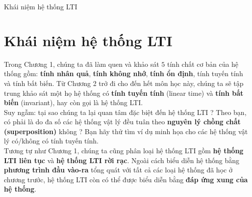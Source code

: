 \documentclass[8pt]{beamer}
\begin{document}
\begin{frame}{Khái niệm hệ thống LTI}
\section{Khái niệm hệ thống LTI}
Trong \alert{Chương 1}, chúng ta đã làm quen và khảo sát $5$ tính chất cơ bản của hệ thống gồm: \textbf{tính nhân quả}, \textbf{tính không nhớ}, \textbf{tính ổn định}, \alert{tính tuyến tính} và \alert{tính bất biến}. Từ \alert{Chương 2} trở đi cho đến hết môn học này, chúng ta sẽ tập trung khảo sát một họ hệ thống có \textbf{tính tuyến tính} (linear time) và \textbf{tính bất biến} (invariant), hay còn gọi là \alert{hệ thống LTI}.
\\ Suy ngẫm: tại sao chúng ta lại quan tâm đặc biệt đến hệ thống LTI ? Theo bạn, có phải là do đa số các hệ thống vật lý đều tuân theo \textbf{nguyên lý chồng chất (superposition)} không ? Bạn hãy thử tìm ví dụ minh họa cho các hệ thống vật lý có/không có tính tuyến tính.
\\ Tương tự như \alert{Chương 1}, chúng ta cũng phân loại hệ thống LTI gồm \textbf{hệ thống LTI liên tục} và \textbf{hệ thống LTI rời rạc}. Ngoài cách biểu diễn hệ thống bằng \textbf{phương trình đầu vào-ra} tổng quát với tất cả các loại hệ thống đã học ở chương trước, hệ thống LTI còn có thể được biểu diễn bằng \textbf{đáp ứng xung của hệ thống}.
\end{frame}
\end{document}
